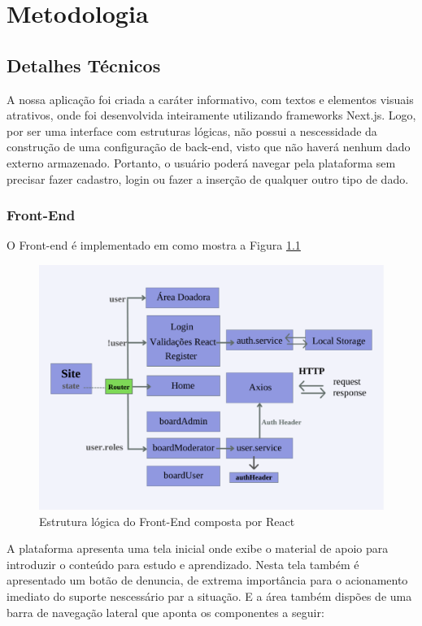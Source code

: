 \chapter{Metodologia}
\section{Detalhes Técnicos}
\label{sec:tech}

A nossa aplicação foi criada a caráter informativo, com textos e elementos visuais atrativos, onde foi desenvolvida inteiramente utilizando frameworks Next.js. Logo, por ser uma interface com estruturas lógicas, não possui a nescessidade da construção de uma configuração de back-end, visto que não haverá nenhum dado externo armazenado. Portanto, o usuário poderá navegar pela plataforma sem precisar fazer cadastro, login ou fazer a inserção de qualquer outro tipo de dado.

\subsection{Front-End}
O Front-end é implementado em \cite{Next.Js} como mostra a Figura \ref{fig:logicFront}

\begin{figure}[h!]
    \centering
    \includegraphics[width=1.0\textwidth]{Figuras/Frontpdf.pdf}
    \caption{Estrutura lógica do Front-End composta por React}
    \label{fig:logicFront}
\end{figure}

A plataforma apresenta uma tela inicial onde exibe o material de apoio para introduzir o conteúdo para estudo e aprendizado. Nesta tela também é apresentado um botão de denuncia, de extrema importância para o acionamento imediato do suporte nescessário par a situação. E a área também dispões de uma barra de navegação lateral que aponta os componentes a seguir:

